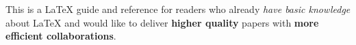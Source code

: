 This is a {\LaTeX} guide and reference for readers who already \textit{have basic knowledge} about {\LaTeX}
and would like to deliver \textbf{higher quality} papers with \textbf{more efficient collaborations}. 
